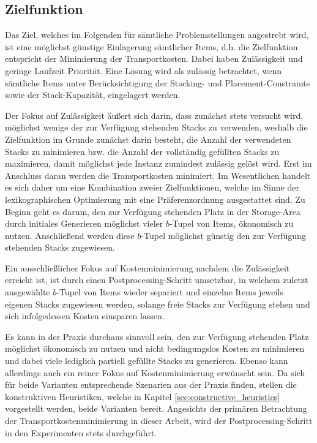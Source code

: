 \subsection{Zielfunktion}
\label{sec:objective}

Das Ziel, welches im Folgenden für sämtliche Problemstellungen angestrebt wird, ist eine möglichst günstige
Einlagerung sämtlicher Items, d.h. die Zielfunktion entspricht der Minimierung der Transportkosten.
Dabei haben Zulässigkeit und geringe Laufzeit Priorität. Eine Lösung wird als zulässig betrachtet,
wenn sämtliche Items unter Berücksichtigung der Stacking- und Placement-Constraints sowie der Stack-Kapazität, eingelagert werden.

Der Fokus auf Zulässigkeit äußert sich darin, dass zunächst stets versucht wird, möglichst wenige der zur Verfügung stehenden Stacks zu verwenden, weshalb die Zielfunktion im Grunde zunächst darin besteht, die Anzahl der verwendeten Stacks zu minimieren bzw. die Anzahl der vollständig gefüllten Stacks zu maximieren, damit möglichst jede Instanz zumindest zulässig gelöst wird.
Erst im Anschluss daran werden die Transportkosten minimiert.
Im Wesentlichen handelt es sich daher um eine Kombination zweier Zielfunktionen,
welche im Sinne der lexikographischen Optimierung mit eine Präferenzordnung ausgestattet sind.
Zu Beginn geht es darum, den zur Verfügung stehenden Platz in der Storage-Area durch initiales Generieren
möglichst vieler $b$-Tupel von Items, ökonomisch zu nutzen. Anschließend werden diese $b$-Tupel
möglichst günstig den zur Verfügung stehenden Stacks zugewiesen.

Ein ausschließlicher Fokus auf Kostenminimierung nachdem die Zulässigkeit erreicht ist, ist durch
einen Postprocessing-Schritt umsetzbar, in welchem zuletzt ausgewählte $b$-Tupel von Items wieder separiert
und einzelne Items jeweils eigenen Stacks zugewiesen werden, solange freie Stacks zur Verfügung stehen
und sich infolgedessen Kosten einsparen lassen.

\pagebreak

Es kann in der Praxis durchaus sinnvoll sein, den zur Verfügung stehenden Platz möglichst ökonomisch zu nutzen
und nicht bedingungslos Kosten zu minimieren und dabei viele lediglich partiell gefüllte Stacks zu generieren.
Ebenso kann allerdings auch ein reiner Fokus auf Kostenminimierung erwünscht sein. Da sich für beide Varianten
entsprechende Szenarien aus der Praxis finden, stellen die konstruktiven Heuristiken,
welche in Kapitel \ref{sec:constructive_heuristics} vorgestellt werden, beide Varianten bereit.
Angesichts der primären Betrachtung der Transportkostenminimierung in dieser Arbeit,
wird der Postprocessing-Schritt in den Experimenten stets durchgeführt.

